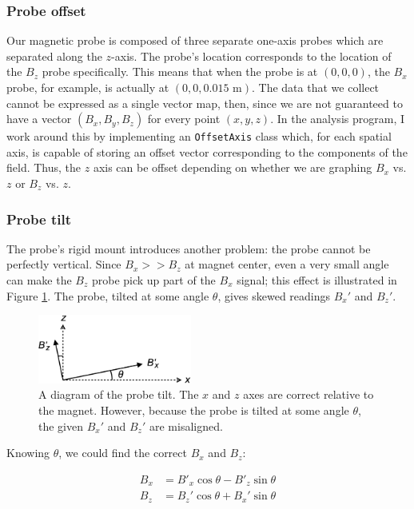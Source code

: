 \documentclass[twocolumn,aps,prb,citeautoscript]{revtex4-1}
\begin{document}
\subsubsection{Probe offset}

Our magnetic probe is composed of three separate one-axis probes which are separated along the $z$-axis.
The probe's location corresponds to the location of the $B_z$ probe specifically. This means that when the probe is
at $(0, 0, 0)$, the $B_x$ probe, for example, is actually at $(0, 0, 0.015\text{ m})$. The data that we collect
cannot be expressed as a single vector map, then, since we are not guaranteed to have a vector $(B_x, B_y, B_z)$
for every point $(x, y, z)$. In the analysis program, I work around this by implementing an \texttt{OffsetAxis}
class which, for each spatial axis, is capable of storing an offset vector corresponding to the components
of the field. Thus, the $z$ axis can be offset depending on whether we are graphing $B_x$ vs. $z$ or
$B_z$ vs. $z$.

\subsubsection{Probe tilt}

The probe's rigid mount introduces another problem: the probe cannot be perfectly vertical.
Since $B_x >> B_z$ at
magnet center, even a very small angle can make the $B_z$ probe pick up part of the $B_x$ signal;
this effect is illustrated in
Figure \ref{fig:angle}. The probe, tilted at some angle $\theta$, gives skewed readings $B_x'$ and $B_z'$.

\begin{figure}
\vspace{15pt}
\includegraphics[width=0.45\textwidth]{figures/probe_tilt.eps}
\caption{\label{fig:angle} A diagram of the probe tilt. The $x$ and $z$ axes are correct relative
to the magnet. However, because the probe is tilted at some angle $\theta$, the given $B_x'$ and $B_z'$
are misaligned.}
\end{figure}

Knowing $\theta$, we could find the correct $B_x$ and $B_z$:

\begin{align*}
B_x &= B'_x \cos\theta - B'_z \sin\theta \\
B_z &= B_z' \cos\theta + B_x' \sin\theta
\end{align*}
\end{document}
